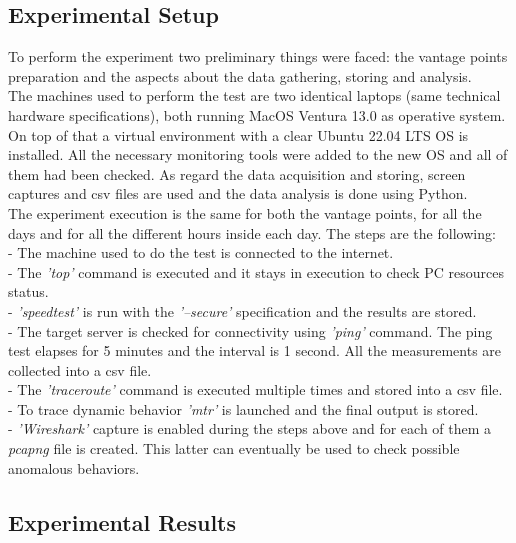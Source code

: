 \documentclass[a4paper,10pt]{article}
\begin{document}
\begin{multicols}{2}
\subsection{Experimental Setup}
To perform the experiment two preliminary things were faced: the vantage points preparation and the aspects about the data gathering, storing 
and analysis.\\
The machines used to perform the test are two identical laptops (same technical hardware specifications), both running MacOS Ventura 
13.0 as operative system. On top of that a virtual environment with a clear Ubuntu 22.04 LTS OS is installed. All the necessary monitoring tools
were added to the new OS and all of them had been checked. As regard the data acquisition and storing, screen captures and csv files are used and
the data analysis is done using Python.\\
The experiment execution is the same for
both the vantage points, for all the days and for all the different hours inside each day. The steps are the following:\\
- The machine used to do the test is connected to the internet.\\
- The \textit{'top'} command is executed and it stays in execution to check PC resources status.\\
- \textit{'speedtest'} is run with the \textit{'--secure'} specification and the results are stored.\\
- The target server is checked for connectivity using \textit{'ping'} command. The ping test elapses for 5 minutes and the interval is  
1 second. All the measurements are collected into a csv file.\\
- The \textit{'traceroute'} command is executed multiple times and stored into a csv file.\\
- To trace dynamic behavior \textit{'mtr'} is launched and the final output is stored.\\
- \textit{'Wireshark'} capture is enabled during the steps above and for each of them a \textit{pcapng} file is created. This latter can 
eventually be used to check possible anomalous behaviors.\\




\subsection{Experimental Results}



\end{multicols}
\end{document}
